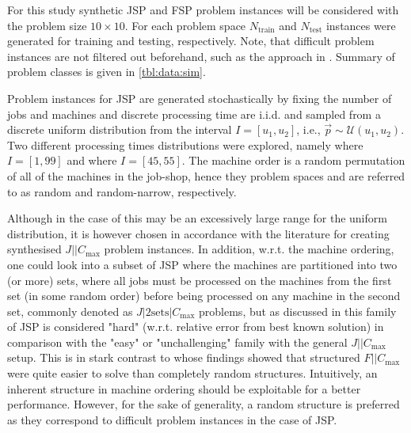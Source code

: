\documentclass[smallextended]{svjour3}
\begin{document}
	
	
	For this study synthetic JSP and FSP problem instances will be considered with the problem size $10\times10$. 
	For each problem space $N_{\text{train}}$  and $N_{\text{test}}$ instances were generated for training and testing, respectively. 
	Note, that difficult problem instances are not filtered out beforehand, such as the approach in \citet{Whitley}. 
	Summary of problem classes is given in \cref{tbl:data:sim}.  
	
	Problem instances for JSP are generated stochastically by fixing the number of jobs and machines and 
	discrete processing time are i.i.d. and sampled from a discrete uniform distribution from the interval $I=[u_1,u_2]$, i.e., $\vec{p}\sim \mathcal{U}(u_1,u_2)$. 
	Two different processing times distributions were explored, namely 
	  where $I=[1,99]$ and   where $I=[45,55]$.
	The machine order is a random permutation of all of the machines in the job-shop, hence they problem spaces    and   are referred to as random and random-narrow, respectively. 
	
	
	Although in the case of   this may be an excessively large range for the uniform distribution, it is however chosen in accordance with the literature \citep{Demirkol98} for creating synthesised $J||C_{\max}$ problem instances. In addition, w.r.t. the machine ordering, one could look into a subset of JSP where the machines are partitioned into two (or more) sets, where all jobs must be processed on the machines from the first set (in some random order) before being processed on any machine in the second set, commonly denoted as $J|2\textrm{sets}|C_{\max}$ problems, but as discussed in \cite{orlib_swv} this family of JSP is considered "hard" (w.r.t. relative error from best known solution) in comparison with the "easy" or "unchallenging" family with the general $J||C_{\max}$ setup. %
	This is in stark contrast to \citet{Whitley} whose findings showed that structured $F||C_{\max}$ were quite easier to solve than completely random structures. 
	Intuitively, an inherent structure in machine ordering should be exploitable for a better performance.  However, for the sake of generality, a random structure is preferred as they correspond to difficult problem instances in the case of JSP. 
	
\end{document}
